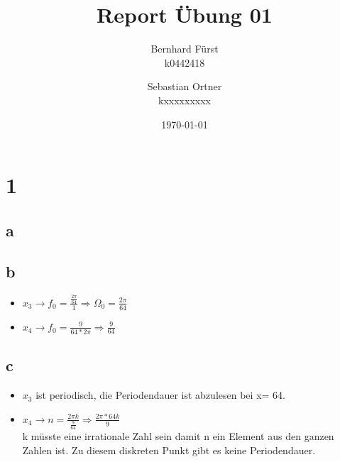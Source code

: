 \documentclass{article}
\author{ Bernhard Fürst \\ k0442418 \and Sebastian Ortner \\ kxxxxxxxxx}
\title{Report Übung 01}
\date{\today}
\begin{document}
    \maketitle
    \section*{1}
    \subsection*{a}
    
    \hspace{-6cm}
    \subsection*{b}
    \begin{itemize}
        \item $x_3 \rightarrow f_0 = \frac{\frac{2\pi}{64}}{1} \Rightarrow  \Omega_0 = \frac{2\pi}{64}$
        \item $x_4 \rightarrow f_0 = \frac{9}{64*2\pi} \Rightarrow \frac{9}{64}$
    \end{itemize}
    \subsection*{c}
    \begin{itemize}
        \item $x_3$ ist periodisch, die Periodendauer ist abzulesen bei x= 64.
        \item $x_4 \rightarrow n = \frac{2\pi k}{\frac{9}{64}}\Rightarrow \frac{2\pi * 64 k}{9}$ \\k müsste eine irrationale Zahl sein damit n ein Element aus den ganzen Zahlen ist. Zu diesem diskreten Punkt gibt es keine Periodendauer. 
    \end{itemize}
\end{document}
